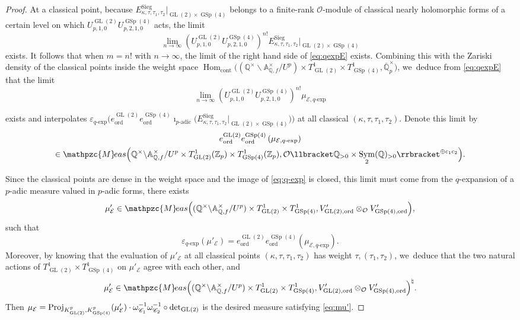 \documentclass[JEP,XML,SOM,Unicode,published]{cedram}
\theoremstyle{plain}
\theoremstyle{remark}
\let\mr\mathrm
\newcommand{\bA}{\mathbb{A}}
\newcommand{\bQ}{\mathbb{Q}}
\newcommand{\bZ}{\mathbb{Z}}
\newcommand{\cE}{\mathcal{E}}
\newcommand{\cO}{\mathcal{O}}
\newcommand{\sC}{\mathscr{C}}
\DeclareMathOperator{\GL}{GL}
\DeclareMathOperator{\GSp}{GSp}
\newcommand{\Meas}{\mathpzc{M}\mkern-2mu eas}
\newcommand{\cont}{\mathrm{cont}}
\newcommand{\ord}{\mathrm{ord}}
\newcommand{\Sieg}{\mr{Sieg}}
\DeclareMathOperator{\Hom}{Hom}
\DeclareMathOperator{\Sym}{Sym}
\newcommand{\adic}{\text{-}\mathrm{adic}}
\newcommand{\qexp}{q\text{-}\mathrm{exp}}
\let\ol\overline
\let\llb\llbracket
\let\rrb\rrbracket
\begin{document}
\begin{proof}
At a classical point, because $E^\Sieg_{\kappa,\tau,\tau_1,\tau_2}\big|_{\GL(2)\times\GSp(4)}$ belongs to a finite-rank $\cO$\nobreakdash-mod\-ule of classical nearly holomorphic forms of a certain level on which $U^{\GL(2)}_{p,1,0} U^{\GSp(4)}_{p,2,1,0}$ acts, the limit
\[
\lim_{n\to\infty} \left(U^{\GL(2)}_{p,1,0} U^{\GSp(4)}_{p,2,1,0}\right)^{n!} E^\Sieg_{\kappa,\tau,\tau_1,\tau_2}\big|_{\GL(2)\times\GSp(4)}
\]
exists. It follows that when $m=n!$ with $n\to\infty$, the limit of the right hand side of \eqref{eq:qexpE} exists. Combining this with the Zariski density of the classical points inside the weight space $\Hom_{\cont}\bigl((\bQ^\times\backslash\bA^\times_{\bQ,f}/U^p)\times T^1_{\GL(2)}\times T^1_{\GSp(4)},\ol{\bQ}^\times_p\bigr)$, we~deduce from \eqref{eq:qexpE} that the limit
\[
\lim_{n\to \infty}\left(U^{\GL(2)}_{p,1,0} U^{\GSp(4)}_{p,2,1,0}\right)^{n!} \mu_{\cE,\qexp}
\]
\begin{minipage}{\textwidth}
exists and interpolates $\varepsilon_{\qexp} \bigl(e^{\GL(2)}_\ord e^{\GSp(4)}_\ord\imath_{p\adic} \bigl(E^\Sieg_{\kappa,\tau,\tau_1,\tau_2}\big|_{\GL(2)\times\GSp(4)}\bigr)\bigr)$ at all classical $(\kappa,\tau,\tau_1,\tau_2)$. Denote this limit by
\begin{multline*}
e^{\GL(2)}_\ord e^{\GSp(4)}_\ord\left(\mu_{\cE,\qexp}\right)\\
\in\Meas\Bigl(\bQ^\times\backslash\bA^\times_{\bQ,f}/U^p\times T^1_{\GL(2)}(\bZ_p)\times T^1_{\GSp(4)}(\bZ_p),\cO\llb\bQ_{>0}\times \Sym_2(\bQ)_{> 0}\rrb^{\oplus c_1c_2}\Bigr).
\end{multline*}
\end{minipage}
Since the classical points are dense in the weight space and the image of \eqref{eq:q-exp} is closed, this limit must come from the $q$-expansion of a $p$-adic measure valued in $p$-adic forms, \ie there exists
\[
\mu'_\cE\in \Meas\Bigl((\bQ^\times\backslash\bA^\times_{\bQ,f}/U^p)\times T^1_{\GL(2)}\times T^1_{\GSp(4)},V'_{\GL(2),\ord}\otimes_\cO V'_{\GSp(4),\ord}\Bigr),
\]
such that
\[
\varepsilon_{\qexp}(\mu'_\cE)=e^{\GL(2)}_\ord e^{\GSp(4)}_\ord(\mu_{\cE,\qexp}).
\]
Moreover, by knowing that the evaluation of $\mu'_\cE$ at all classical points $(\kappa,\tau,\tau_1,\tau_2)$ has weight $\tau,(\tau_1,\tau_2)$, we~deduce that the two natural actions of $T^1_{\GL(2)}\times T^1_{\GSp(4)}$ on $\mu'_\cE$ agree with each other, and
\[
\mu'_\cE\in \Meas\Bigl((\bQ^\times\backslash\bA^\times_{\bQ,f}/U^p)\times T^1_{\GL(2)}\times T^1_{\GSp(4)},V'_{\GL(2),\ord}\otimes_\cO V'_{\GSp(4),\ord}\Bigr)^\natural.
\]
Then $\mu_\cE={\rm Proj}_{K^p_{\GL(2)},K^p_{\GSp(4)}}(\mu'_\cE)\cdot \omega^{-1}_{\sC_1}\omega^{-1}_{\sC_2}\circ{\rm det}_{\GL(2)}$ is the desired measure satisfying \eqref{eq:mu'}.
\end{proof}
\end{document}

